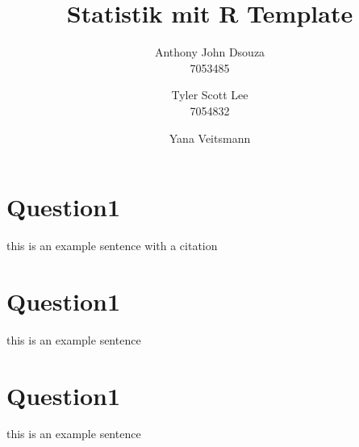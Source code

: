 \documentclass{article}
\title{\vspace {-30mm}\Huge \bfseries \textsc Statistik mit R Template}
\author{Anthony John Dsouza \\ 7053485 \and Tyler Scott Lee \\ 7054832 \and Yana Veitsmann \\ }
\date{} %
\begin{document}
	\maketitle
	
	\section{Question1}
	this is an example sentence with a citation \cite{vaswani1234}
	
	\section{Question1}
	this is an example sentence
	
	\section{Question1}
	this is an example sentence
	
	
	
\end{document}
